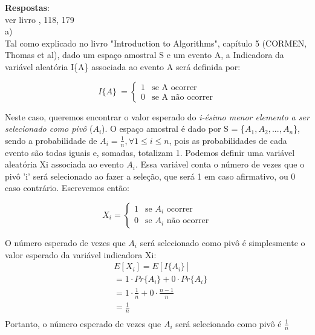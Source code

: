 \documentclass{article}
\begin{document}
\textbf{Respostas}:\\

ver livro , 118, 179\\


a)\\
Tal como explicado no livro "Introduction to Algorithms", capítulo 5 (CORMEN, Thomas et al), dado um espaço amostral S e um evento A, a Indicadora da variável aleatória I\{A\} associada ao evento A será definida por:

\[
 I\{A\}\ =
\left\{
\begin{array}{ll}
1& \textrm{se A ocorrer}\\
0& \textrm{se A não ocorrer}
\end{array}
\right.
\]

Neste caso, queremos encontrar o valor esperado do \textit{i-ésimo menor elemento a ser selecionado como pivô} ($A_{i}$). O espaço amostral é dado por S = \{$A_{1}, A_{2}, ..., A_{n}$\}, sendo a probabilidade de $A_{i} = \frac{1}{n}, \forall 1\leq i \leq  n$, pois as probabilidades de cada evento são todas iguais e, somadas, totalizam 1.
Podemos definir uma variável aleatória Xi associada ao evento $A_{i}$. Essa variável conta o número de vezes que o pivô 'i' será selecionado ao fazer a seleção, que será 1 em caso afirmativo, ou 0 caso contrário. Escrevemos então:

\[
X_{i} =
\left\{
\begin{array}{ll}
1& \textrm{se $A_{i}$ ocorrer}\\
0& \textrm{se $A_{i}$ não ocorrer}
\end{array}
\right.
\]

O número esperado de vezes que $A_{i}$ será selecionado como pivô é simplesmente o valor esperado da variável indicadora Xi:	 \\
\begin{align*}
& E[X_{i}] = E[I\{A_{i}\}] \\
& = 1\cdot Pr\{A_{i}\} + 0\cdot Pr\{A_{i}\}  \\
& = 1\cdot\frac{1}{n} + 0\cdot\frac{n-1}{n} \\
& = \frac{1}{n}\\
\end{align*}
Portanto, o número esperado de vezes que $A_{i}$ será selecionado como pivô é $\frac{1}{n}$ \\
\end{document}
